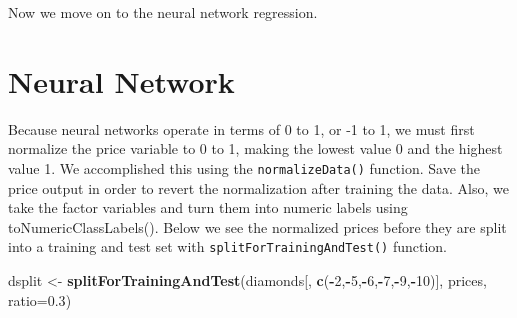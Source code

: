 \documentclass[]{book}
\newenvironment{Shaded}{\begin{snugshade}}{\end{snugshade}}
\newcommand{\CommentTok}[1]{\textcolor[rgb]{0.56,0.35,0.01}{\textit{#1}}}
\newcommand{\DataTypeTok}[1]{\textcolor[rgb]{0.13,0.29,0.53}{#1}}
\newcommand{\DecValTok}[1]{\textcolor[rgb]{0.00,0.00,0.81}{#1}}
\newcommand{\FloatTok}[1]{\textcolor[rgb]{0.00,0.00,0.81}{#1}}
\newcommand{\KeywordTok}[1]{\textcolor[rgb]{0.13,0.29,0.53}{\textbf{#1}}}
\newcommand{\NormalTok}[1]{#1}
\newcommand{\OperatorTok}[1]{\textcolor[rgb]{0.81,0.36,0.00}{\textbf{#1}}}
\newcommand{\StringTok}[1]{\textcolor[rgb]{0.31,0.60,0.02}{#1}}
\begin{document}
Now we move on to the neural network regression.

\hypertarget{neural-network-1}{%
\section{Neural Network}\label{neural-network-1}}

Because neural networks operate in terms of 0 to 1, or -1 to 1, we must first normalize the price variable to 0 to 1, making the lowest value 0 and the highest value 1. We accomplished this using the \texttt{normalizeData()} function. Save the price output in order to revert the normalization after training the data. Also, we take the factor variables and turn them into numeric labels using toNumericClassLabels(). Below we see the normalized prices before they are split into a training and test set with \texttt{splitForTrainingAndTest()} function.

\begin{Shaded}
\end{Shaded}

\begin{Shaded}
\begin{Highlighting}[]
\NormalTok{dsplit <-}\StringTok{ }\KeywordTok{splitForTrainingAndTest}\NormalTok{(diamonds[, }\KeywordTok{c}\NormalTok{(}\OperatorTok{-}\DecValTok{2}\NormalTok{,}\OperatorTok{-}\DecValTok{5}\NormalTok{,}\OperatorTok{-}\DecValTok{6}\NormalTok{,}\OperatorTok{-}\DecValTok{7}\NormalTok{,}\OperatorTok{-}\DecValTok{9}\NormalTok{,}\OperatorTok{-}\DecValTok{10}\NormalTok{)], prices, }\DataTypeTok{ratio=}\FloatTok{0.3}\NormalTok{)}
\end{Highlighting}
\end{Shaded}
\end{document}
